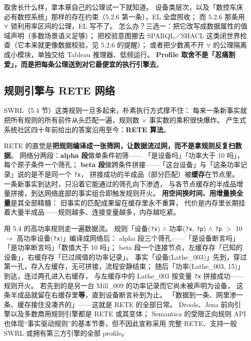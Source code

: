 取舍长什么样，拿本章自己的公理试一下就知道。
设备类层次，以及「数控车床必有数控系统」那样的存在约束（5.2.6 第一条），EL 全盘照收；
而 5.2.6 那条用 \(\forall\) 锁利用率区间的公理，EL 写不了。
怎么办？三选一：把它改写成数据属性的值域声明（多数场景语义足够）；
把校验意图挪去 SPARQL／SHACL 这类闭世界检查（它本来就更像数据校验，见 5.2.6 的提醒）；
或者把少数离不开 \(\forall\) 的公理隔离成小模块，单独交给 Tableau 推理器、低频运行。
\textbf{Profile 取舍不是「忍痛割爱」，而是把每条公理送到对它最便宜的执行引擎去}。

\subsection{规则引擎与 RETE 网络}

SWRL（5.4 节）这类规则一旦多起来，朴素执行方式撑不住：
每来一条新事实就把所有规则的所有前件从头匹配一遍，规则数 \(\times\) 事实数的乘积很快爆炸。
产生式系统社区四十年前给出的答案沿用至今：\textbf{RETE 算法}。

RETE 的直觉是\textbf{把规则编译成一张筛网，让数据流过网，而不是拿规则反复扫数据}。
网络分两段：\textbf{alpha 段}做单条件初筛——
「是设备吗」「功率大于 10 吗」，每个原子条件一个筛孔；
\textbf{beta 段}做跨条件拼接——「这台设备」与「这条功率记录」说的是不是同一个 \texttt{?x}，
拼接成功的半成品（部分匹配）被\textbf{缓存}在节点里。
一条新事实到达时，只沿着它能通过的筛孔向下渗透，
与各节点缓存的半成品增量拼接，到达网络底部的事实组合即触发规则开火。
\textbf{用空间换时间、用增量换全量}是其全部精髓：
旧事实的匹配成果留在缓存里永不重算，
代价是内存里长期挂着大量半成品——规则越多、连接变量越多，内存越吃紧。

用 5.4 的高功率规则走一遍数据流。
规则「设备(\texttt{?x}) \(\land\) 功率(\texttt{?x}, \texttt{?p}) \(\land\)
\texttt{?p} \(>\) 10 \(\rightarrow\) 高功率设备(\texttt{?x})」编译成网络后：
alpha 段三个筛孔——「是设备断言吗」「是功率断言吗」「数值大于 10 吗」；
beta 段一个连接节点，左缓存存「已知的设备」，右缓存存「已过阈值的功率记录」。
事实「设备(Lathe\_003)」先到，穿过第一孔，存入左缓存，无可拼接，流程安静结束；
随后「功率(Lathe\_003, 15)」到达，连过两孔进入右缓存，
与左缓存中的 Lathe\_003 按变量 \texttt{?x} 拼接成功——规则开火。
若先到的是另一台 Mill\_009 的功率记录而它尚未被声明为设备，
这条半成品就留在右缓存里\textbf{等}，直到设备断言补到为止。
「数据到一条、网里渗一条、缓存接住没凑齐的」——这就是 RETE 的全部日常。
Drools、Jena 前向引擎以及多数商用规则引擎都是 RETE 或其变体；
Semantica 的受限正向规则 API 也体现“事实驱动规则”的基本节奏，但不因此宣称采用
完整 RETE、支持一般 SWRL 或拥有第三方引擎的全部 profile。

